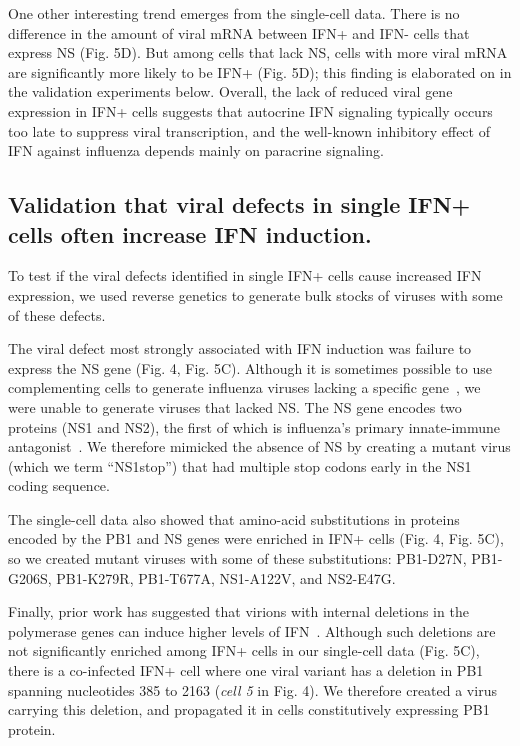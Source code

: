 \documentclass[]{article}
\begin{document}
One other interesting trend emerges from the single-cell data.
There is no difference in the amount of viral mRNA between IFN+ and IFN- cells that express NS (Fig. 5D).
But among cells that lack NS, cells with more viral mRNA are significantly more likely to be IFN+ (Fig. 5D); this finding is elaborated on in the validation experiments below.
Overall, the lack of reduced viral gene expression in IFN+ cells suggests that autocrine IFN signaling typically occurs too late to suppress viral transcription, and the well-known inhibitory effect of IFN against influenza depends mainly on paracrine signaling.

\subsection*{Validation that viral defects in single IFN+ cells often increase IFN induction.}

To test if the viral defects identified in single IFN+ cells cause increased IFN expression, we used reverse genetics to generate bulk stocks of viruses with some of these defects.

The viral defect most strongly associated with IFN induction was failure to express the NS gene (Fig. 4, Fig. 5C).
Although it is sometimes possible to use complementing cells to generate influenza viruses lacking a specific gene~\cite{fujii2003selective,marsh2007specific}, we were unable to generate viruses that lacked NS.
The NS gene encodes two proteins (NS1 and NS2), the first of which is influenza's primary innate-immune antagonist~\cite{garcia1998influenza, hale2008multifunctional}.
We therefore mimicked the absence of NS by creating a mutant virus (which we term ``NS1stop'') that had multiple stop codons early in the NS1 coding sequence.

The single-cell data also showed that amino-acid substitutions in proteins encoded by the PB1 and NS genes were enriched in IFN+ cells (Fig. 4, Fig. 5C), so we created mutant viruses with some of these substitutions:
PB1-D27N, PB1-G206S, PB1-K279R, PB1-T677A, NS1-A122V, and NS2-E47G.

Finally, prior work has suggested that virions with internal deletions in the polymerase genes can induce higher levels of IFN~\cite{wang2018cell, baum2010preference, tapia2013defective, boergeling2015evidence, dimmock2015cloned, liu2019inhibition}.
Although such deletions are not significantly enriched among IFN+ cells in our single-cell data (Fig. 5C), there is a co-infected IFN+ cell where one viral variant has a deletion in PB1 spanning nucleotides 385 to 2163 (\textit{cell 5} in Fig. 4).
We therefore created a virus carrying this deletion, and propagated it in cells constitutively expressing PB1 protein.
\end{document}
